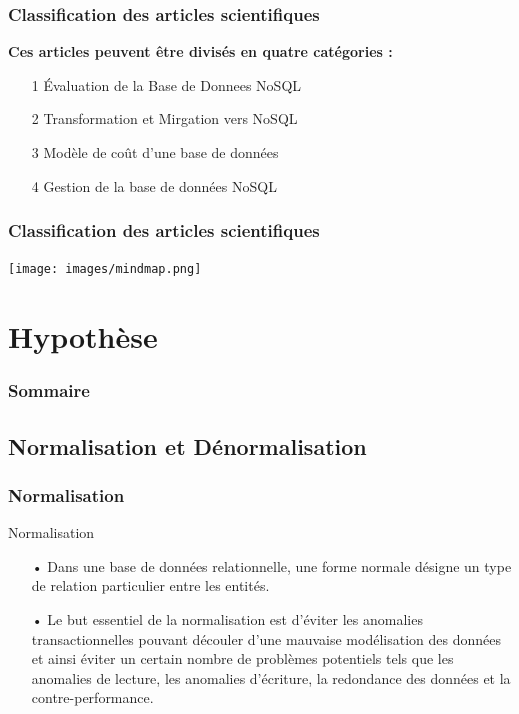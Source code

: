 \documentclass[xcolor=dvipsnames]{beamer}
\begin{document}
\begin{frame}[fragile]
	\frametitle{Classification des articles scientifiques}
	\textbf{Ces articles peuvent être divisés en quatre catégories :}
	\begin{itemize}
		\item[1] Évaluation de la Base de Donnees NoSQL
		\item[2] Transformation et Mirgation vers NoSQL
		\item[3] Modèle de coût d’une base de données
		\item[4] Gestion de la base de données NoSQL
	\end{itemize}	
\end{frame}

\begin{frame}[fragile]
	\frametitle{Classification des articles scientifiques}
	\texttt{[image: images/mindmap.png]}
\end{frame}

\section{Hypothèse}
\begin{frame}
\frametitle{Sommaire}
\tableofcontents[currentsection]
\end{frame}


\subsection{Normalisation et Dénormalisation}
\begin{frame}[fragile]
	\frametitle{Normalisation}
	\begin{block}{Normalisation}
		\begin{itemize}
			\item[•] Dans une base de données relationnelle, une forme normale désigne un type de relation particulier entre les entités.
			\item[•] Le but essentiel de la normalisation est d'éviter les anomalies transactionnelles pouvant découler d'une mauvaise modélisation des données et ainsi éviter un certain nombre de problèmes potentiels tels que les anomalies de lecture, les anomalies d'écriture, la redondance des données et la contre-performance.
		\end{itemize}
	\end{block}
\end{frame}
\end{document}
